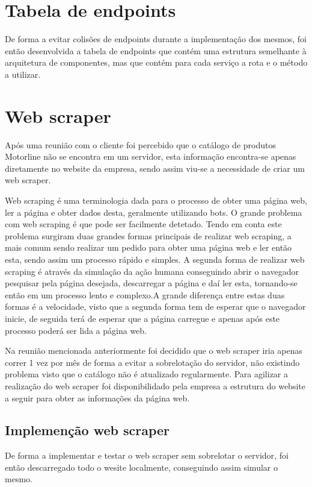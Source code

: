 \section{Tabela de endpoints}
De forma a evitar colisões de endpoints durante a implementação dos mesmos, foi então desenvolvida a 
tabela de endpoints que contém uma estrutura semelhante à arquitetura de componentes, mas que contém 
para cada serviço a rota e o método a utilizar.



\newpage

\section{Web scraper}

Após uma reunião com o cliente foi percebido que o catálogo de produtos Motorline não se encontra em um
servidor, esta informação encontra-se apenas diretamente no website da empresa, sendo assim viu-se a 
necessidade de criar um web scraper.

Web scraping é uma terminologia dada para o processo de obter uma página web, ler a página e obter
dados desta, geralmente utilizando bots. O grande problema com web scraping é que pode ser facilmente
detetado. Tendo em conta este problema surgiram duas grandes formas principais de realizar web scraping,
a mais comum sendo realizar um pedido para obter uma página web e ler então esta, sendo assim um processo
rápido e simples. A segunda forma de realizar web scraping é através da simulação da ação humana 
conseguindo abrir o navegador pesquisar pela página desejada, descarregar a página e daí ler esta, 
tornando-se então em um processo lento e complexo.A grande diferença entre estas duas formas é a 
velocidade, visto que a segunda forma tem de esperar que o navegador inicie, de seguida terá de 
esperar que a página carregue e apenas após este processo poderá ser lida a página web.

Na reunião mencionada anteriormente foi decidido que o web scraper iria apenas correr 1 vez por mês
de forma a evitar a sobrelotação do servidor, não existindo problema visto que o catálogo não é 
atualizado regularmente. Para agilizar a realização do web scraper foi disponibilidado pela 
empresa a estrutura do website a seguir para obter as informações da página web.

\subsection{Implemenção web scraper}
De forma a implementar e testar o web scraper sem sobrelotar o servidor, foi então descarregado todo
o wesite localmente, conseguindo assim simular o mesmo.

